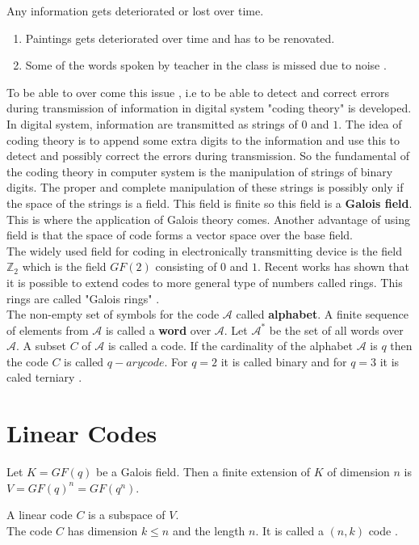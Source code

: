 Any information gets deteriorated or lost over time.

\begin{enumerate}
\item Paintings gets deteriorated over time and has to be renovated.
\item Some of the words spoken by teacher in the class is missed due to noise \cite{coding}.
\end{enumerate}

To be able to over come this issue , i.e to be able to detect and correct errors during transmission of information in digital system "coding theory" is developed.
In digital system, information are transmitted as strings of \(0\) and \(1\). The idea of coding theory is to append some extra digits to the information and use this to detect and possibly correct the errors during transmission.
So the fundamental of the coding theory in computer system is the manipulation of strings of binary digits. The proper and complete manipulation of these strings is possibly only if the space of the strings is a field. This field is finite so this field is a \textbf{Galois field}. This is where the application of Galois theory comes.
Another advantage of using field is that the space of code forms a vector space over the base field. \\
The widely used field for coding in electronically transmitting device is the field \({\mathbb{Z}}_2\) which is the field \(GF(2)\) consisting of \(0\) and \(1\). Recent works has shown that it is possible to extend codes to more general type of numbers called rings. This rings are called "Galois rings" \cite{error_correct}.\\

The non-empty set of symbols for the code \(\mathcal{A}\) called \textbf{alphabet}. A finite sequence of elements from \(\mathcal{A}\) is called a \textbf{word} over \(\mathcal{A}\). Let \(\mathcal{A}^*\) be the set of all words over \(\mathcal{A}\). A subset \(C\) of \(\mathcal{A}\) is called a code.
If the cardinality of the alphabet \(\mathcal{A}\) is \(q\) then the code \(C\) is called \(q-ary code\). For \(q=2\) it is called binary and for \(q=3\) it is caled terniary \cite{error_correct}.

\section{Linear Codes}
Let \(K=GF(q)\) be a Galois field. Then a finite extension of \(K\) of dimension \(n\) is \(V=GF(q)^n=GF(q^n)\).
\begin{definition}
  A linear code \(C\) is a subspace of \(V\). \\
  The code \(C\) has dimension \(k \leq n\) and the length \(n\). It is called a \((n,k)\) code \cite{error_correct}.
\end{definition}


